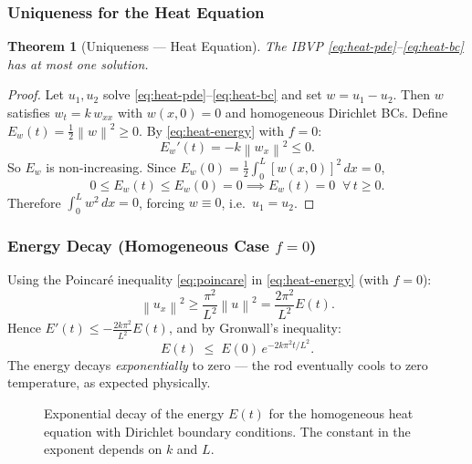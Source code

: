 \documentclass[12pt,a4paper]{article}
\theoremstyle{plain}
\newtheorem{theorem}{Theorem}[section]
\theoremstyle{definition}
\newcommand{\norm}[1]{\left\lVert #1 \right\rVert}
\begin{document}
\subsubsection*{Uniqueness for the Heat Equation}

\begin{theorem}[Uniqueness — Heat Equation]
  \label{thm:heat-unique}
  The IBVP \eqref{eq:heat-pde}--\eqref{eq:heat-bc} has at most one solution.
\end{theorem}

\begin{proof}
Let $u_1,u_2$ solve \eqref{eq:heat-pde}--\eqref{eq:heat-bc} and set $w=u_1-u_2$.
Then $w$ satisfies $w_t = k\,w_{xx}$ with $w(x,0)=0$ and homogeneous Dirichlet BCs.
Define $E_w(t)=\tfrac{1}{2}\norm{w}^2\geq 0$.
By \eqref{eq:heat-energy} with $f=0$:
\[
  E_w'(t) = -k\norm{w_x}^2 \leq 0.
\]
So $E_w$ is non-increasing. Since $E_w(0)=\tfrac{1}{2}\int_0^L[w(x,0)]^2\,dx=0$,
\[
  0 \leq E_w(t) \leq E_w(0) = 0 \implies E_w(t)=0\;\;\forall\, t\geq 0.
\]
Therefore $\int_0^L w^2\,dx=0$, forcing $w\equiv 0$, i.e.\ $u_1=u_2$.
\end{proof}

\subsubsection*{Energy Decay (Homogeneous Case $f=0$)}

Using the Poincar\'{e} inequality \eqref{eq:poincare} in \eqref{eq:heat-energy}
(with $f=0$):
\[
  \norm{u_x}^2 \geq \frac{\pi^2}{L^2}\norm{u}^2 = \frac{2\pi^2}{L^2}E(t).
\]
Hence $E'(t)\leq -\tfrac{2k\pi^2}{L^2}E(t)$, and by Gronwall's inequality:
\begin{equation}
  E(t) \;\leq\; E(0)\,e^{-2k\pi^2 t/L^2}.
  \label{eq:heat-decay}
\end{equation}
The energy decays \emph{exponentially} to zero — the rod eventually cools to
zero temperature, as expected physically.

\begin{figure}[H]
\centering
{}
\caption{Exponential decay of the energy $E(t)$ for the homogeneous heat equation
  with Dirichlet boundary conditions. The constant in the exponent depends on $k$
  and $L$.}
\label{fig:heat-decay}
\end{figure}
\end{document}
